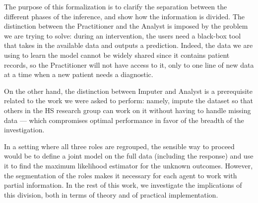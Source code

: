 The purpose of this formalization is to clarify the separation between the different phases of the inference, and show how the information is divided. The distinction between the Practitioner and the Analyst is imposed by the problem we are trying to solve: during an intervention, the users need a black-box tool that takes in the available data and outputs a prediction. Indeed, the data we are using to learn the model cannot be widely shared since it contains patient records, so the Practitioner will not have access to it, only to one line of new data at a time when a new patient needs a diagnostic.

On the other hand, the distinction between Imputer and Analyst is a prerequisite related to the work we were asked to perform: namely, impute the dataset so that others in the HS research group can work on it without having to handle missing data --- which compromises optimal performance in favor of the breadth of the investigation.

In a setting where all three roles are regrouped, the sensible way to proceed would be to define a joint model on the full data (including the response) and use it to find the maximum likelihood estimator for the unknown outcomes. However, the segmentation of the roles makes it necessary for each agent to work with partial information. In the rest of this work, we investigate the implications of this division, both in terms of theory and of practical implementation.

